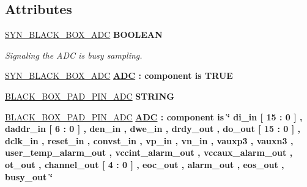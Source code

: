 \subsection*{Attributes}
 \begin{DoxyCompactItemize}
\item 
\hypertarget{classADC__TOP_1_1TOP__ADC_a32f4997bcfad751ba77794903af40d92}{\hyperlink{classADC__TOP_1_1TOP__ADC_a32f4997bcfad751ba77794903af40d92}{S\-Y\-N\-\_\-\-B\-L\-A\-C\-K\-\_\-\-B\-O\-X\-\_\-\-A\-D\-C} {\bfseries \textcolor{comment}{B\-O\-O\-L\-E\-A\-N}\textcolor{vhdlchar}{ }} }\label{classADC__TOP_1_1TOP__ADC_a32f4997bcfad751ba77794903af40d92}

\begin{DoxyCompactList}\small\item\em Signaling the A\-D\-C is busy sampling. \end{DoxyCompactList}\item 
\hypertarget{classADC__TOP_1_1TOP__ADC_a737609c62913b04be3bb776fbce18464}{\hyperlink{classADC__TOP_1_1TOP__ADC_a737609c62913b04be3bb776fbce18464}{S\-Y\-N\-\_\-\-B\-L\-A\-C\-K\-\_\-\-B\-O\-X\-\_\-\-A\-D\-C} {\bfseries {\bfseries \hyperlink{classADC__TOP_1_1TOP__ADC_ad251174263b28388454816799ffd91ae}{A\-D\-C}} \textcolor{vhdlchar}{ }\textcolor{vhdlchar}{\-:}\textcolor{vhdlchar}{ }\textcolor{vhdlkeyword}{component}\textcolor{vhdlchar}{ }\textcolor{vhdlkeyword}{is}\textcolor{vhdlchar}{ }\textcolor{vhdlchar}{T\-R\-U\-E}\textcolor{vhdlchar}{ }} }\label{classADC__TOP_1_1TOP__ADC_a737609c62913b04be3bb776fbce18464}

\item 
\hypertarget{classADC__TOP_1_1TOP__ADC_a05f1935151676cf5c0d14df52f28c3b1}{\hyperlink{classADC__TOP_1_1TOP__ADC_a05f1935151676cf5c0d14df52f28c3b1}{B\-L\-A\-C\-K\-\_\-\-B\-O\-X\-\_\-\-P\-A\-D\-\_\-\-P\-I\-N\-\_\-\-A\-D\-C} {\bfseries \textcolor{comment}{S\-T\-R\-I\-N\-G}\textcolor{vhdlchar}{ }} }\label{classADC__TOP_1_1TOP__ADC_a05f1935151676cf5c0d14df52f28c3b1}

\item 
\hypertarget{classADC__TOP_1_1TOP__ADC_a731a305d96f244bae6982ef51e5298be}{\hyperlink{classADC__TOP_1_1TOP__ADC_a731a305d96f244bae6982ef51e5298be}{B\-L\-A\-C\-K\-\_\-\-B\-O\-X\-\_\-\-P\-A\-D\-\_\-\-P\-I\-N\-\_\-\-A\-D\-C} {\bfseries {\bfseries \hyperlink{classADC__TOP_1_1TOP__ADC_ad251174263b28388454816799ffd91ae}{A\-D\-C}} \textcolor{vhdlchar}{ }\textcolor{vhdlchar}{\-:}\textcolor{vhdlchar}{ }\textcolor{vhdlkeyword}{component}\textcolor{vhdlchar}{ }\textcolor{vhdlkeyword}{is}\textcolor{vhdlchar}{ }\textcolor{keyword}{\char`\"{} di\-\_\-in \mbox{[} 15 \-: 0 \mbox{]} , daddr\-\_\-in \mbox{[} 6 \-: 0 \mbox{]} , den\-\_\-in , dwe\-\_\-in , drdy\-\_\-out , do\-\_\-out \mbox{[} 15 \-: 0 \mbox{]} , dclk\-\_\-in , reset\-\_\-in , convst\-\_\-in , vp\-\_\-in , vn\-\_\-in , vauxp3 , vauxn3 , user\-\_\-temp\-\_\-alarm\-\_\-out , vccint\-\_\-alarm\-\_\-out , vccaux\-\_\-alarm\-\_\-out , ot\-\_\-out , channel\-\_\-out \mbox{[} 4 \-: 0 \mbox{]} , eoc\-\_\-out , alarm\-\_\-out , eos\-\_\-out , busy\-\_\-out \char`\"{}}\textcolor{vhdlchar}{ }} }\label{classADC__TOP_1_1TOP__ADC_a731a305d96f244bae6982ef51e5298be}

\end{DoxyCompactItemize}
